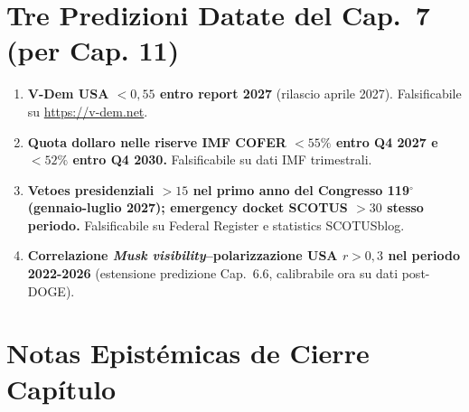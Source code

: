 \section{Tre Predizioni Datate del Cap.~7 (per Cap.
11)}\label{tre-predizioni-datate-del-cap.-7-per-cap.-11}

\begin{enumerate}
\def\labelenumi{\arabic{enumi}.}
\tightlist
\item
  \textbf{V-Dem USA \(< 0{,}55\) entro report 2027} (rilascio aprile
  2027). Falsificabile su \url{https://v-dem.net}.
\item
  \textbf{Quota dollaro nelle riserve IMF COFER \(< 55\%\) entro Q4 2027
  e \(< 52\%\) entro Q4 2030.} Falsificabile su dati IMF trimestrali.
\item
  \textbf{Vetoes presidenziali \(> 15\) nel primo anno del Congresso
  119$^\circ$ (gennaio-luglio 2027); emergency docket SCOTUS \(> 30\) stesso
  periodo.} Falsificabile su Federal Register e statistics SCOTUSblog.
\item
  \textbf{Correlazione \emph{Musk visibility}--polarizzazione USA
  \(r > 0{,}3\) nel periodo 2022-2026} (estensione predizione Cap.~6.6,
  calibrabile ora su dati post-DOGE).
\end{enumerate}



\section{Notas Epistémicas de Cierre
Capítulo}\label{note-epistemiche-di-chiusura-capítulo}

